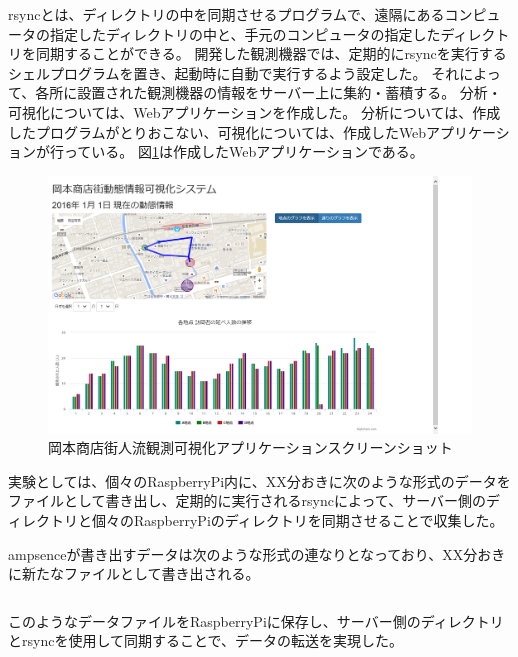 rsyncとは、ディレクトリの中を同期させるプログラムで、遠隔にあるコンピュータの指定したディレクトリの中と、手元のコンピュータの指定したディレクトリを同期することができる。
開発した観測機器では、定期的にrsyncを実行するシェルプログラムを置き、起動時に自動で実行するよう設定した。
それによって、各所に設置された観測機器の情報をサーバー上に集約・蓄積する。
分析・可視化については、Webアプリケーションを作成した。
分析については、作成したプログラムがとりおこない、可視化については、作成したWebアプリケーションが行っている。
図\ref{fig:okamoto_ss}は作成したWebアプリケーションである。
\begin{figure}[htbp]
\includegraphics[width=16cm]{images/okamoto_scr1.png}
\caption{岡本商店街人流観測可視化アプリケーションスクリーンショット}
\label{fig:okamoto_ss}
\end{figure}


実験としては、個々のRaspberryPi内に、XX分おきに次のような形式のデータをファイルとして書き出し、定期的に実行されるrsyncによって、サーバー側のディレクトリと個々のRaspberryPiのディレクトリを同期させることで収集した。

ampsenceが書き出すデータは次のような形式の連なりとなっており、XX分おきに新たなファイルとして書き出される。
\begin{lstlisting}
\end{lstlisting}
このようなデータファイルをRaspberryPiに保存し、サーバー側のディレクトリとrsyncを使用して同期することで、データの転送を実現した。

